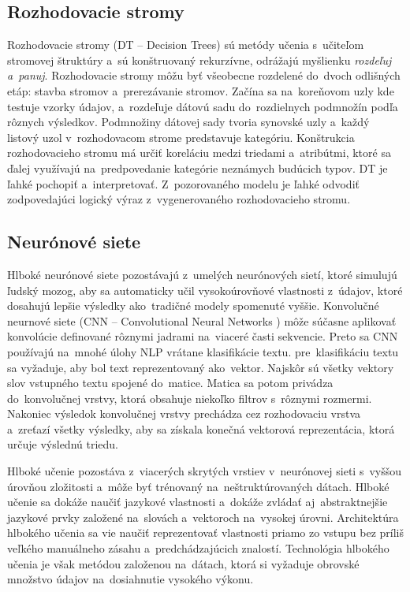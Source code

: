 \subsection*{Rozhodovacie stromy}
Rozhodovacie stromy (DT -- Decision Trees) sú metódy učenia s~učiteľom stromovej štruktúry a~sú konštruovaný rekurzívne, odrážajú myšlienku \textit{rozdeľuj a~panuj}. Rozhodovacie stromy môžu byť všeobecne rozdelené do~dvoch odlišných etáp: stavba stromov a~prerezávanie stromov. Začína sa na~koreňovom uzly kde testuje vzorky údajov, a~rozdeľuje dátovú sadu do~rozdielnych podmnožín podľa rôznych výsledkov. Podmnožiny dátovej sady tvoria synovské uzly a~každý listový uzol v~rozhodovacom strome predstavuje kategóriu. Konštrukcia rozhodovacieho stromu má určiť koreláciu medzi triedami a~atribútmi, ktoré sa ďalej využívajú na~predpovedanie kategórie neznámych budúcich typov. DT je ľahké pochopiť a~interpretovať. Z~pozorovaného modelu je ľahké odvodiť zodpovedajúci logický výraz z~vygenerovaného rozhodovacieho stromu.

\subsection*{Neurónové siete}
Hlboké neurónové siete pozostávajú z~umelých neurónových sietí, ktoré simulujú ľudský mozog, aby sa automaticky učil vysokoúrovňové vlastnosti z~údajov, ktoré dosahujú lepšie výsledky ako~tradičné modely spomenuté vyššie. Konvolučné neurnové siete (CNN -- Convolutional Neural Networks ) môže súčasne aplikovať konvolúcie definované rôznymi jadrami na~viaceré časti sekvencie. Preto sa CNN používajú na~mnohé úlohy NLP vrátane klasifikácie textu. pre~klasifikáciu textu sa vyžaduje, aby bol text reprezentovaný ako~vektor. Najskôr sú všetky vektory slov vstupného textu spojené do~matice. Matica sa potom privádza do~konvolučnej vrstvy, ktorá obsahuje niekoľko filtrov s~rôznymi rozmermi. Nakoniec výsledok konvolučnej vrstvy prechádza cez rozhodovaciu vrstva a~zreťazí všetky výsledky, aby sa získala konečná vektorová reprezentácia, ktorá určuje výslednú triedu. 

Hlboké učenie pozostáva z~viacerých skrytých vrstiev v~neurónovej sieti s~vyššou úrovňou zložitosti a~môže byť trénovaný na~neštruktúrovaných dátach. Hlboké učenie sa dokáže naučiť jazykové vlastnosti a~dokáže zvládať aj~abstraktnejšie jazykové prvky založené na~slovách a~vektoroch na~vysokej úrovni. Architektúra hlbokého učenia sa vie naučiť reprezentovať vlastnosti priamo zo vstupu bez príliš veľkého manuálneho zásahu a~predchádzajúcich znalostí. Technológia hlbokého učenia je však metódou založenou na~dátach, ktorá si vyžaduje obrovské množstvo údajov na~dosiahnutie vysokého výkonu. 

